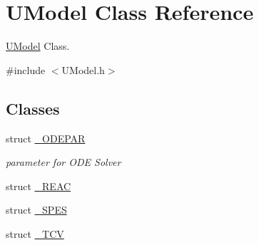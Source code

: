 \hypertarget{classUModel}{}\section{U\+Model Class Reference}
\label{classUModel}


\hyperlink{classUModel}{U\+Model} Class.  




{\ttfamily \#include $<$U\+Model.\+h$>$}

\subsection*{Classes}
\begin{DoxyCompactItemize}
\item 
struct \hyperlink{structUModel_1_1__ODEPAR}{\+\_\+\+O\+D\+E\+P\+AR}
\begin{DoxyCompactList}\small\item\em parameter for O\+DE Solver \end{DoxyCompactList}\item 
struct \hyperlink{structUModel_1_1__REAC}{\+\_\+\+R\+E\+AC}
\item 
struct \hyperlink{structUModel_1_1__SPES}{\+\_\+\+S\+P\+ES}
\item 
struct \hyperlink{structUModel_1_1__TCV}{\+\_\+\+T\+CV}
\end{DoxyCompactItemize}
